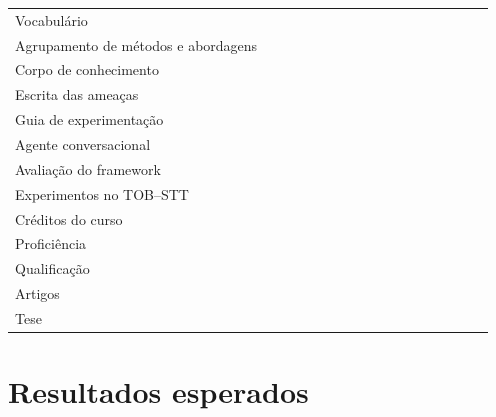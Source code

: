 \begin{quadro}[!ht]
\begin{tabular}{|l|c|c|c|c|c|c|c|c|c|c|c|c|c|c|c|c|}
  & \x & \x & \x & \y & \x & \x & \x & \y & \y & \x & \x & \x & \x & \x & \x & \x  \\
  \hline
  Vocabulário           
  & \x & \x & \x & \x & \x & \x & \x & \x & \y & \y & \x & \x & \x & \x & \x & \x  \\
  \hline
  Agrupamento de métodos e abordagens  
  & \x & \x & \x & \x & \x & \x & \x & \x & \x & \x & \y & \x & \x & \x & \x & \x  \\
  \hline
  Corpo de conhecimento
  & \x & \x & \x & \x & \x & \x & \x & \x & \x & \x & \y & \x & \x & \x & \x & \x  \\
  \hline
  Escrita das ameaças
  & \x & \x & \x & \x & \x & \x & \x & \x & \x & \x & \x & \y & \x & \x & \x & \x  \\
  \hline
  Guia de experimentação
  & \x & \x & \x & \x & \x & \x & \x & \x & \x & \x & \x & \x & \y & \x & \x & \x  \\
  \hline
  Agente conversacional
  & \x & \x & \x & \x & \x & \x & \x & \x & \x & \x & \x & \x & \x & \y & \x & \x  \\
  \hline
  Avaliação do framework
  & \x & \x & \x & \x & \x & \x & \x & \x & \x & \x & \x & \x & \x & \x & \y & \x  \\
  \hline
  Experimentos no TOB--STT
  & \x & \x & \y & \x & \x & \y & \x & \x & \x & \y & \x & \x & \y & \x & \y & \y  \\
  \hline  
  Créditos do curso          
  & \y & \y & \y & \x & \x & \x & \x & \x & \x & \x & \x & \x & \x & \x & \x & \x  \\
  \hline
  Proficiência  
  & \y & \x & \x & \x & \x & \x & \x & \x & \x & \x & \x & \x & \x & \x & \x & \x  \\
  \hline
  Qualificação          
  & \x & \x & \x & \x & \x & \x & \y & \y & \x & \x & \x & \x & \x & \x & \x & \x  \\
  \hline
  Artigos
  & \x & \x & \y & \x & \y & \y & \x & \x & \y & \x & \y & \x & \y & \x & \x & \y  \\
  \hline
  Tese          
  & \x & \x & \x & \x & \x & \x & \x & \y & \x & \x & \x & \x & \x & \x & \x & \y  \\
  \hline
\end{tabular}
 \label{tab:schedule}
\end{quadro}


\section{Resultados esperados}

